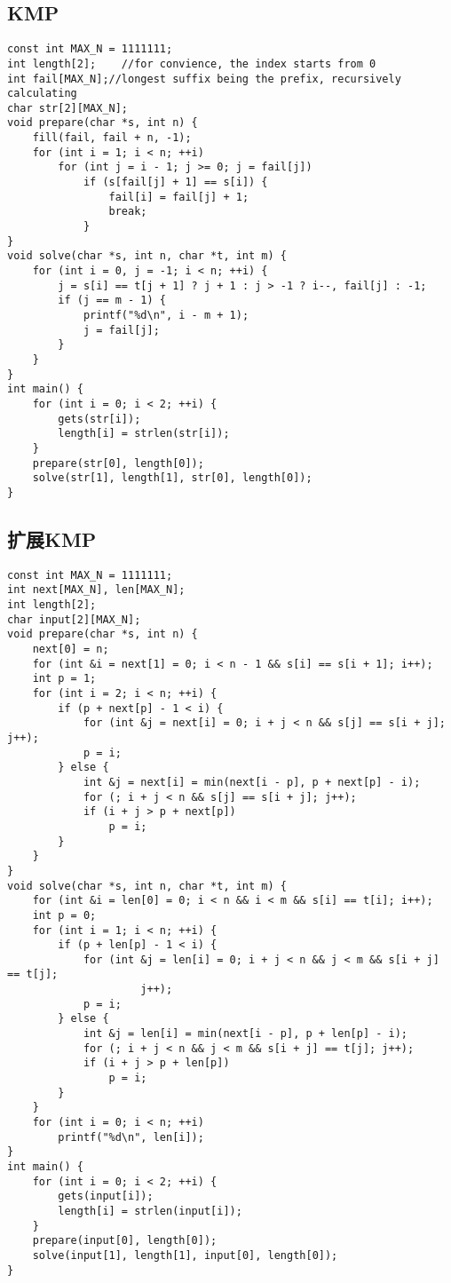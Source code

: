 \documentclass{article}
\begin{document}
\subsection{KMP}

\begin{lstlisting}
const int MAX_N = 1111111;
int length[2];    //for convience, the index starts from 0
int fail[MAX_N];//longest suffix being the prefix, recursively calculating
char str[2][MAX_N];
void prepare(char *s, int n) {
    fill(fail, fail + n, -1);
    for (int i = 1; i < n; ++i)
        for (int j = i - 1; j >= 0; j = fail[j])
            if (s[fail[j] + 1] == s[i]) {
                fail[i] = fail[j] + 1;
                break;
            }
}
void solve(char *s, int n, char *t, int m) {
    for (int i = 0, j = -1; i < n; ++i) {
        j = s[i] == t[j + 1] ? j + 1 : j > -1 ? i--, fail[j] : -1;
        if (j == m - 1) {
            printf("%d\n", i - m + 1);
            j = fail[j];
        }
    }
}
int main() {
    for (int i = 0; i < 2; ++i) {
        gets(str[i]);
        length[i] = strlen(str[i]);
    }
    prepare(str[0], length[0]);
    solve(str[1], length[1], str[0], length[0]);
}
\end{lstlisting}

\subsection{扩展KMP}

\begin{lstlisting}
const int MAX_N = 1111111;
int next[MAX_N], len[MAX_N];
int length[2];
char input[2][MAX_N];
void prepare(char *s, int n) {
    next[0] = n;
    for (int &i = next[1] = 0; i < n - 1 && s[i] == s[i + 1]; i++);
    int p = 1;
    for (int i = 2; i < n; ++i) {
        if (p + next[p] - 1 < i) {
            for (int &j = next[i] = 0; i + j < n && s[j] == s[i + j]; j++);
            p = i;
        } else {
            int &j = next[i] = min(next[i - p], p + next[p] - i);
            for (; i + j < n && s[j] == s[i + j]; j++);
            if (i + j > p + next[p])
                p = i;
        }
    }
}
void solve(char *s, int n, char *t, int m) {
    for (int &i = len[0] = 0; i < n && i < m && s[i] == t[i]; i++);
    int p = 0;
    for (int i = 1; i < n; ++i) {
        if (p + len[p] - 1 < i) {
            for (int &j = len[i] = 0; i + j < n && j < m && s[i + j] == t[j];
                     j++);
            p = i;
        } else {
            int &j = len[i] = min(next[i - p], p + len[p] - i);
            for (; i + j < n && j < m && s[i + j] == t[j]; j++);
            if (i + j > p + len[p])
                p = i;
        }
    }
    for (int i = 0; i < n; ++i)
        printf("%d\n", len[i]);
}
int main() {
    for (int i = 0; i < 2; ++i) {
        gets(input[i]);
        length[i] = strlen(input[i]);
    }
    prepare(input[0], length[0]);
    solve(input[1], length[1], input[0], length[0]);
}
\end{lstlisting}
\end{document}

